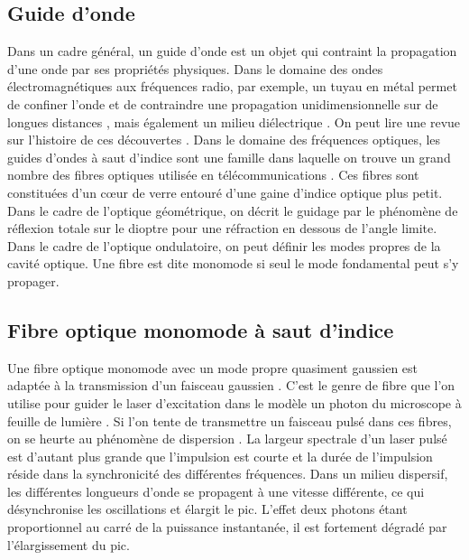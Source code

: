 \subsection{Guide d'onde}

Dans un cadre général, un guide d'onde est un objet qui contraint la propagation d'une onde par ses propriétés physiques. Dans le domaine des ondes électromagnétiques aux fréquences radio, par exemple, un tuyau en métal permet de confiner l'onde et de contraindre une propagation unidimensionnelle sur de longues distances \cite{miller_low-loss_1953}, mais également un milieu diélectrique \cite{unger_circular_1957}. On peut lire une revue sur l'histoire de ces découvertes \cite{packard_origin_1984}.
Dans le domaine des fréquences optiques, les guides d'ondes à saut d'indice sont une famille dans laquelle on trouve un grand nombre des fibres optiques utilisée en télécommunications \cite{maurer_glass_1973}. Ces fibres sont constituées d'un cœur de verre entouré d'une gaine d'indice optique plus petit. Dans le cadre de l'optique géométrique, on décrit le guidage par le phénomène de réflexion totale sur le dioptre pour une réfraction en dessous de l'angle limite. Dans le cadre de l'optique ondulatoire, on peut définir les modes propres de la cavité optique. Une fibre est dite monomode si seul le mode fondamental peut s'y propager.

\subsection{Fibre optique monomode à saut d'indice} %

Une fibre optique monomode avec un mode propre quasiment gaussien est adaptée à la transmission d'un faisceau gaussien \cite{ankiewicz_generalized_1992}. C'est le genre de fibre que l'on utilise pour guider le laser d'excitation dans le modèle un photon du microscope à feuille de lumière \cite{migault_whole-brain_2018}. Si l'on tente de transmettre un faisceau pulsé dans ces fibres, on se heurte au phénomène de dispersion \cite{gloge_dispersion_1971} \cite{jurgensen_gaussian_1978}. La largeur spectrale d'un laser pulsé est d'autant plus grande que l'impulsion est courte et la durée de l'impulsion réside dans la synchronicité des différentes fréquences. Dans un milieu dispersif, les différentes longueurs d'onde se propagent à une vitesse différente, ce qui désynchronise les oscillations et élargit le pic. L'effet deux photons étant proportionnel au carré de la puissance instantanée, il est fortement dégradé par l'élargissement du pic. %

